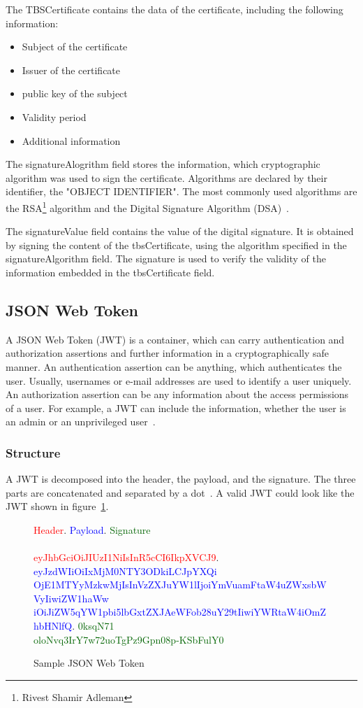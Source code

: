 The TBSCertificate contains the data of the certificate, including the following information:
\begin{itemize}
    \item Subject of the certificate
    \item Issuer of the certificate
    \item public key of the subject
    \item Validity period
    \item Additional information
\end{itemize}

The signatureAlogrithm field stores the information, which cryptographic algorithm was used to sign the certificate.
Algorithms are declared by their identifier, the "OBJECT IDENTIFIER".
The most commonly used algorithms are the RSA\footnote{Rivest Shamir Adleman} algorithm and the Digital Signature Algorithm (DSA)~\cite{x509rfc}.

The signatureValue field contains the value of the digital signature.
It is obtained by signing the content of the tbsCertificate, using the algorithm specified in the signatureAlgorithm field.
The signature is used to verify the validity of the information embedded in the tbsCertificate field.

\subsection{JSON Web Token}
A JSON Web Token (JWT) is a container, which can carry authentication and authorization assertions and further information in a cryptographically safe manner.
An authentication assertion can be anything, which authenticates the user.
Usually, usernames or e-mail addresses are used to identify a user uniquely.
An authorization assertion can be any information about the access permissions of a user.
For example, a JWT can include the information, whether the user is an admin or an unprivileged user~\cite{dias2020microservices}. 

\subsubsection{Structure}
A JWT is decomposed into the header, the payload, and the signature.
The three parts are concatenated and separated by a dot~\cite{jwtdocauth0}.
A valid JWT could look like the JWT shown in figure~\ref{fig:myjwt}.
\begin{figure}
    \textcolor{red}{Header}.
	\textcolor{blue}{Payload}.
	\textcolor{darkgreen}{Signature} \\ \\
    \textcolor{red}{eyJhbGciOiJIUzI1NiIsInR5cCI6IkpXVCJ9}.
	\textcolor{blue}{eyJzdWIiOiIxMjM0NTY3ODkiLCJpYXQi\\OjE1MTYyMzkwMjIsInVzZXJuYW1lIjoiYmVuamFtaW4uZWxsbWVyIiwiZW1haWw\\iOiJiZW5qYW1pbi5lbGxtZXJAeWFob28uY29tIiwiYWRtaW4iOmZhbHNlfQ}.
	\textcolor{darkgreen}{0ksqN71\\oloNvq3IrY7w72uoTgPz9Gpn08p-KSbFulY0}
    \caption{Sample JSON Web Token}
    \label{fig:myjwt}
\end{figure}

